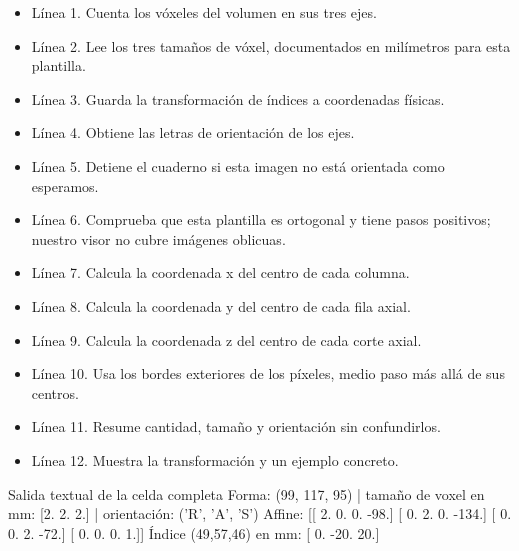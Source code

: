 
\begin{itemize}

\item Línea 1. Cuenta los vóxeles del volumen en sus tres ejes.

\item Línea 2. Lee los tres tamaños de vóxel, documentados en milímetros para esta plantilla.

\item Línea 3. Guarda la transformación de índices a coordenadas físicas.

\item Línea 4. Obtiene las letras de orientación de los ejes.

\item Línea 5. Detiene el cuaderno si esta imagen no está orientada como esperamos.

\item Línea 6. Comprueba que esta plantilla es ortogonal y tiene pasos positivos; nuestro visor no cubre imágenes oblicuas.

\item Línea 7. Calcula la coordenada x del centro de cada columna.

\item Línea 8. Calcula la coordenada y del centro de cada fila axial.

\item Línea 9. Calcula la coordenada z del centro de cada corte axial.

\item Línea 10. Usa los bordes exteriores de los píxeles, medio paso más allá de sus centros.

\item Línea 11. Resume cantidad, tamaño y orientación sin confundirlos.

\item Línea 12. Muestra la transformación y un ejemplo concreto.

\end{itemize}

\begin{Salida}{Salida textual de la celda completa}
Forma: (99, 117, 95) | tamaño de voxel en mm: [2. 2. 2.] | orientación: ('R', 'A', 'S')
Affine:
 [[   2.    0.    0.  -98.]
 [   0.    2.    0. -134.]
 [   0.    0.    2.  -72.]
 [   0.    0.    0.    1.]] 
Índice (49,57,46) en mm: [  0. -20.  20.]
\end{Salida}

